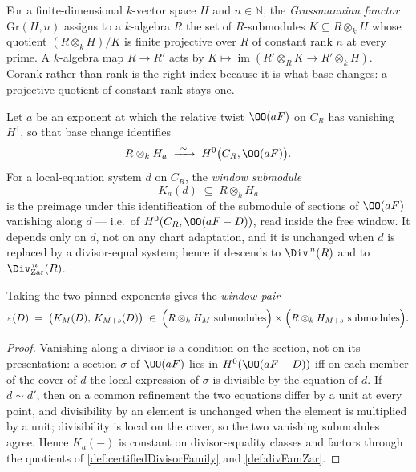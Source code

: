\begin{definition}
  \label{def:grFunctorAff}
  \leanok
  For a finite-dimensional \(k\)-vector space \(H\) and \(n \in \mathbb{N}\), the
  \emph{Grassmannian functor} \(\mathrm{Gr}(H, n)\) assigns to a \(k\)-algebra \(R\) the set
  of \(R\)-submodules \(K \subseteq R \otimes_k H\) whose quotient \((R \otimes_k H)/K\) is
  finite projective over \(R\) of constant rank \(n\) at every prime. A \(k\)-algebra map
  \(R \to R'\) acts by \(K \mapsto \operatorname{im}(R' \otimes_R K \to R' \otimes_k H)\).
  Corank rather than rank is the right index because it is what base-changes: a projective
  quotient of constant rank stays one.
\end{definition}

\begin{definition}
  \label{def:divisorWindow}
  \leanok
  Let \(a\) be an exponent at which the relative twist \(\OO(aF)\) on \(C_R\) has vanishing
  \(H^1\), so that base change identifies
  \[
    R \otimes_k H_a \;\xrightarrow{\ \sim\ }\; H^0\bigl(C_R, \OO(aF)\bigr).
  \]
  For a local-equation system \(d\) on \(C_R\), the \emph{window submodule}
  \[
    K_a(d) \;\subseteq\; R \otimes_k H_a
  \]
  is the preimage under this identification of the submodule of sections of \(\OO(aF)\)
  vanishing along \(d\) --- i.e.\ of \(H^0(C_R, \OO(aF - D))\), read inside the free
  window. It depends only on \(d\), not on any chart adaptation, and it is unchanged when
  \(d\) is replaced by a divisor-equal system; hence it descends to \(\Div^{\,n}(R)\) and to
  \(\Div^{\,n}_{\mathrm{Zar}}(R)\).

  Taking the two pinned exponents gives the \emph{window pair}
  \[
    \varepsilon(D) \;=\; \bigl(K_M(D),\, K_{M+s}(D)\bigr)
      \;\in\; \Bigl(R \otimes_k H_M \ \text{submodules}\Bigr)
        \times \Bigl(R \otimes_k H_{M+s}\ \text{submodules}\Bigr).
  \]
\end{definition}
\begin{proof}
  \leanok
  Vanishing along a divisor is a condition on the section, not on its presentation:
  a section \(\sigma\) of \(\OO(aF)\) lies in \(H^0(\OO(aF-D))\) iff on each member of the
  cover of \(d\) the local expression of \(\sigma\) is divisible by the equation of \(d\).
  If \(d \sim d'\), then on a common refinement the two equations differ by a unit at every
  point, and divisibility by an element is unchanged when the element is multiplied by a
  unit; divisibility is local on the cover, so the two vanishing submodules agree. Hence
  \(K_a(-)\) is constant on divisor-equality classes and factors through the quotients of
  \ref{def:certifiedDivisorFamily} and \ref{def:divFamZar}.
\end{proof}

